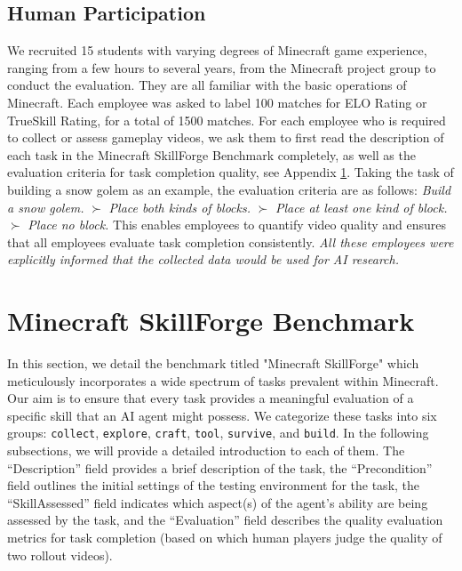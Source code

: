\documentclass[11pt, a4paper, logo, one column]{craftjarvis}
\begin{document}
\subsection{Human Participation} \fancyfoot[L]{}
We recruited 15 students with varying degrees of Minecraft game experience, ranging from a few hours to several years, from the Minecraft project group to conduct the evaluation. They are all familiar with the basic operations of Minecraft. Each employee was asked to label 100 matches for ELO Rating or TrueSkill Rating, for a total of 1500 matches. For each employee who is required to collect or assess gameplay videos, we ask them to first read the description of each task in the Minecraft SkillForge Benchmark completely, as well as the evaluation criteria for task completion quality, see Appendix \ref{appendix:benchmark}. Taking the task of building a snow golem as an example, the evaluation criteria are as follows: \textit{Build a snow golem.} $\succ$ \textit{Place both kinds of blocks.} $\succ$ \textit{Place at least one kind of block.} $\succ$ \textit{Place no block.} This enables employees to quantify video quality and ensures that all employees evaluate task completion consistently.
\emph{All these employees were explicitly informed that the collected data would be used for AI research.}



\section{Minecraft SkillForge Benchmark}
\label{appendix:benchmark}

In this section, we detail the benchmark titled "Minecraft SkillForge" which meticulously incorporates a wide spectrum of tasks prevalent within Minecraft. Our aim is to ensure that every task provides a meaningful evaluation of a specific skill that an AI agent might possess. We categorize these tasks into six groups: \texttt{collect}, \texttt{explore}, \texttt{craft}, \texttt{tool}, \texttt{survive}, and \texttt{build}. 
In the following subsections, we will provide a detailed introduction to each of them. The ``Description'' field provides a brief description of the task, the ``Precondition'' field outlines the initial settings of the testing environment for the task, the ``SkillAssessed'' field indicates which aspect(s) of the agent's ability are being assessed by the task, and the ``Evaluation'' field describes the quality evaluation metrics for task completion (based on which human players judge the quality of two rollout videos). 
\end{document}
